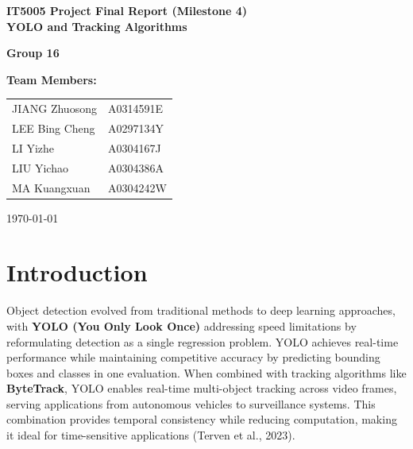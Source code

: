 \documentclass[11pt]{article}
\begin{document}
\begin{titlepage}
    \centering
    
    \vspace*{3cm}
    
    {\LARGE \textbf{IT5005 Project Final Report (Milestone 4)\\ YOLO and Tracking Algorithms}}
    
    \vspace{2cm}
    
    {\Large \textbf{Group 16}}
    
    \vspace{2cm}
    
    {\Large \textbf{Team Members:}}
    
    \vspace{1cm}
    
    \begin{tabular}{ll}
        JIANG Zhuosong & A0314591E \\
        LEE Bing Cheng & A0297134Y \\
        LI Yizhe & A0304167J \\
        LIU Yichao & A0304386A \\
        MA Kuangxuan & A0304242W
    \end{tabular}
    
    \vspace{2cm}
    
    \vspace{1cm}
    
    {\Large \today}
    
\end{titlepage}

\newpage

\makeatother
\tableofcontents
\newpage

\section{Introduction}
Object detection evolved from traditional methods to deep learning approaches, with \textbf{YOLO (You Only Look Once)} addressing speed limitations by reformulating detection as a single regression problem. YOLO achieves real-time performance while maintaining competitive accuracy by predicting bounding boxes and classes in one evaluation. When combined with tracking algorithms like \textbf{ByteTrack}, YOLO enables real-time multi-object tracking across video frames, serving applications from autonomous vehicles to surveillance systems. This combination provides temporal consistency while reducing computation, making it ideal for time-sensitive applications (Terven et al., 2023).
\end{document}
